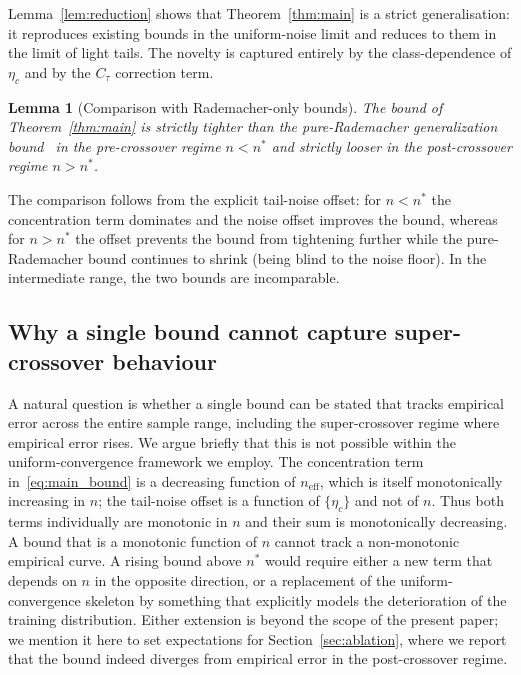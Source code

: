 \documentclass[11pt]{article}
\newtheorem{lemma}[theorem]{Lemma}
\begin{document}
Lemma~\ref{lem:reduction} shows that Theorem~\ref{thm:main} is a strict generalisation: it reproduces existing bounds in the uniform-noise limit and reduces to them in the limit of light tails. The novelty is captured entirely by the class-dependence of $\eta_c$ and by the $C_{\tau}$ correction term.

\begin{lemma}[Comparison with Rademacher-only bounds]
\label{lem:rademacher_compare}
The bound of Theorem~\ref{thm:main} is strictly tighter than the pure-Rademacher generalization bound~\cite{shalev2014understanding} in the pre-crossover regime $n < n^{*}$ and strictly looser in the post-crossover regime $n > n^{*}$.
\end{lemma}

The comparison follows from the explicit tail-noise offset: for $n < n^{*}$ the concentration term dominates and the noise offset improves the bound, whereas for $n > n^{*}$ the offset prevents the bound from tightening further while the pure-Rademacher bound continues to shrink (being blind to the noise floor). In the intermediate range, the two bounds are incomparable.

\subsection{Why a single bound cannot capture super-crossover behaviour}

A natural question is whether a single bound can be stated that tracks empirical error across the entire sample range, including the super-crossover regime where empirical error rises. We argue briefly that this is not possible within the uniform-convergence framework we employ. The concentration term in~\eqref{eq:main_bound} is a decreasing function of $n_{\mathrm{eff}}$, which is itself monotonically increasing in $n$; the tail-noise offset is a function of $\{\eta_c\}$ and not of $n$. Thus both terms individually are monotonic in $n$ and their sum is monotonically decreasing. A bound that is a monotonic function of $n$ cannot track a non-monotonic empirical curve. A rising bound above $n^{*}$ would require either a new term that depends on $n$ in the opposite direction, or a replacement of the uniform-convergence skeleton by something that explicitly models the deterioration of the training distribution. Either extension is beyond the scope of the present paper; we mention it here to set expectations for Section~\ref{sec:ablation}, where we report that the bound indeed diverges from empirical error in the post-crossover regime.
\end{document}
